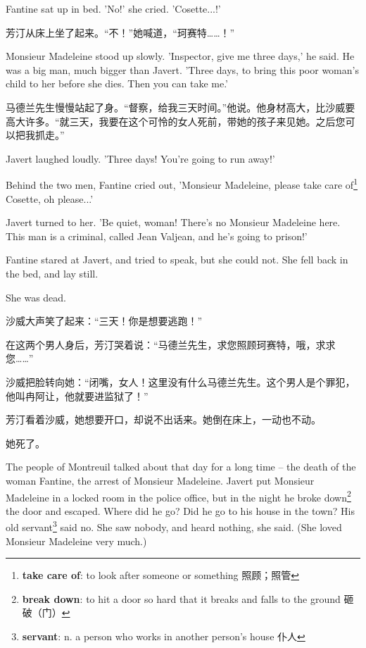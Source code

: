 \documentclass[fontset=ubuntu, zihao=5]{ctexart}
\begin{document}
\begin{paracol}{2}
Fantine sat up in bed. 'No!' she cried. 'Cosette...!'

\switchcolumn

芳汀从床上坐了起来。“不！”她喊道，“珂赛特……！”

\switchcolumn*

Monsieur Madeleine stood up slowly. 'Inspector, give me three days,' he said. He was a big man, much bigger than Javert. 'Three days, to bring this poor woman's child to her before she dies. Then you can take me.'

\switchcolumn

马德兰先生慢慢站起了身。“督察，给我三天时间。”他说。他身材高大，比沙威要高大许多。“就三天，我要在这个可怜的女人死前，带她的孩子来见她。之后您可以把我抓走。”

\switchcolumn*

Javert laughed loudly. 'Three days! You're going to run away!'

Behind the two men, Fantine cried out, 'Monsieur Madeleine, please take care of\footnote{\textbf{take care of}:  to look after someone or something 照顾；照管}
 Cosette, oh please...'

Javert turned to her. 'Be quiet, woman! There's no Monsieur Madeleine here. This man is a criminal, called Jean Valjean, and he's going to prison!'

Fantine stared at Javert, and tried to speak, but she could not. She fell back in the bed, and lay still.

She was dead.


\switchcolumn

沙威大声笑了起来：“三天！你是想要逃跑！”

在这两个男人身后，芳汀哭着说：“马德兰先生，求您照顾珂赛特，哦，求求您……”


沙威把脸转向她：“闭嘴，女人！这里没有什么马德兰先生。这个男人是个罪犯，他叫冉阿让，他就要进监狱了！”


芳汀看着沙威，她想要开口，却说不出话来。她倒在床上，一动也不动。


她死了。

\switchcolumn*

The people of Montreuil talked about that day for a long time – the death of the woman Fantine, the arrest of Monsieur Madeleine. Javert put Monsieur Madeleine in a locked room in the police office, but in the night he broke down\footnote{\textbf{break down}: to hit a door so hard that it breaks and falls to the ground 砸破（门）}
 the door and escaped. Where did he go? Did he go to his house in the town? His old servant\footnote{\textbf{servant}: n. a person who works in another person's house 仆人}
 said no. She saw nobody, and heard nothing, she said. (She loved Monsieur Madeleine very much.)


\end{paracol}
\end{document}
